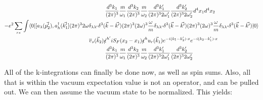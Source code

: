 \documentclass[a4]{article}
\begin{document}
\begin{framed}
\begin{equation}
\begin{aligned}
                    \frac{d^3 k_1}{(2 \pi)^{3}} \frac{m}{\omega_1} \frac{d^3 k_2}{(2 \pi)^{3}} \frac{m}{\omega_2} & \frac{d^3 k'_1}{(2 \pi)^{3} 2 \omega'_1} \frac{d^3 k'_2}{(2 \pi)^{3} 2 \omega'_2} d^4 x_1 d^4 x_2 \\
                    - e^{2} \sum_{r s} \int \langle 0 |[a_{\lambda} (\vec{p'_2}),a^{\dagger}_{h} (\vec{k'_1}] (2 \pi)^{3} 2 \omega \delta_{\lambda \lambda'} \delta^{3} (\vec{k} - \vec{k'}) (2 \pi)^{3} (2 \omega)^{3} & \frac{\omega}{m} \delta_{\lambda \lambda'} \delta^{3} (\vec{k} - \vec{k'}) (2 \pi)^{3} (2 \omega)^{3} \frac{\omega}{m} \delta_{\lambda \lambda'} \delta^{3} (\vec{k} - \vec{k'})| 0 \rangle \\
                    \overline{v}_{s} (\vec{k}_2) \slashed{\epsilon}^{h'} i S_{F} (x_2 - x_1) \slashed{\epsilon}^{h} & u_{r} (\vec{k}_1) e^{- i (k_1 - k'_2) \cdot x} e^{- i (k_2 - k'_1) \cdot x} \\
                    \frac{d^3 k_1}{(2 \pi)^{3}} \frac{m}{\omega_1} \frac{d^3 k_2}{(2 \pi)^{3}} \frac{m}{\omega_2} & \frac{d^3 k'_1}{(2 \pi)^{3} 2 \omega'_1} \frac{d^3 k'_2}{(2 \pi)^{3} 2 \omega'_2}
                \end{aligned}
            \end{equation}

            All of the k-integrations can finally be done now, as well as spin sums. Also, all that is within the vacuum expectation value is not an
            operator, and can be pulled out. We can then assume the vacuum state to be normalized. This yields:


\end{framed}
\end{document}
